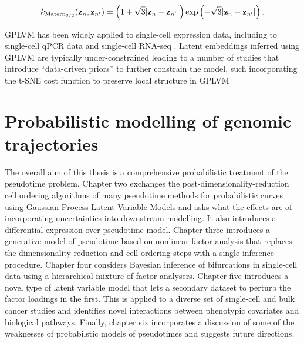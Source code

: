 \begin{equation}
  k_{\text{Matern}_{3/2}}(\mathbf{z}_n, \mathbf{z}_{n'}) =
  \left(
  1 + \sqrt{3} \lvert \mathbf{z}_n - \mathbf{z}_{n'} \rvert \right) \exp\left( - \sqrt{3} \lvert \mathbf{z}_n - \mathbf{z}_{n'} \rvert \right).
\end{equation}

GPLVM has been widely applied to single-cell expression data, including to single-cell qPCR data \cite{buettner2012novel} and single-cell RNA-seq \cite{campbell2016order,macaulay2016single}. Latent embeddings inferred using GPLVM are typically under-constrained leading to a number of studies that introduce ``data-driven priors'' to further constrain the model, such incorporating the t-SNE cost function to preserve local structure in GPLVM \cite{van2009preserving}

\section{Probabilistic modelling of genomic trajectories}

The overall aim of this thesis is a comprehensive probabilistic treatment of the pseudotime problem. Chapter two exchanges the post-dimensionality-reduction cell ordering algorithms of many pseudotime methods for probabilistic curves using Gaussian Process Latent Variable Models and asks what the effects are of incorporating uncertainties into downstream modelling. It also introduces a differential-expression-over-pseudotime model.
Chapter three introduces a generative model of pseudotime based on nonlinear factor analysis that replaces the dimensionality reduction and cell ordering steps with a single inference procedure.
Chapter four considers Bayesian inference of bifurcations in single-cell data using a hierarchical mixture of factor analysers.
Chapter five introduces a novel type of latent variable model that lets a secondary dataset to perturb the factor loadings in the first. This is applied to a diverse set of single-cell and bulk cancer studies and identifies novel interactions between phenotypic covariates and biological pathways.
Finally, chapter six incorporates a discussion of some of the weaknesses of probabilstic models of pseudotimes and suggests future directions.
